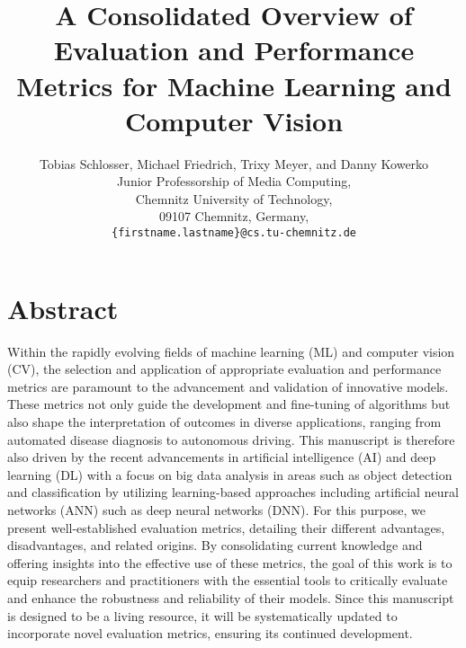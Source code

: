 \documentclass{article}
\newcommand{\ORCID}[1]{\textsuperscript{\href{https://orcid.org/#1}{\textcolor[HTML]{A6CE39}{\faOrcid}}}}
\newcommand{\ORCIDSchlosser}{0000-0002-0682-4284} %
\newcommand{\ORCIDFriedrich}{0000-0001-6326-4749} %
\newcommand{\ORCIDMeyer}{0000-0002-3372-1619}     %
\newcommand{\ORCIDKowerko}{0000-0002-4538-7814}   %
\begin{document}
\title{\Huge A Consolidated Overview of Evaluation and Performance Metrics for Machine Learning and Computer Vision}

\author{
	Tobias Schlosser\ORCID{\ORCIDSchlosser}, Michael Friedrich\ORCID{\ORCIDFriedrich}, Trixy Meyer\ORCID{\ORCIDMeyer}, and Danny Kowerko\ORCID{\ORCIDKowerko} \\[1ex]
	Junior Professorship of Media Computing, \\
	Chemnitz University of Technology, \\
	09107 Chemnitz, Germany, \\
	\texttt{\{firstname.lastname\}@cs.tu-chemnitz.de}
}




\maketitle




\section*{Abstract}

Within the rapidly evolving fields of machine learning (ML) and computer vision (CV), the selection and application of appropriate evaluation and performance metrics are paramount to the advancement and validation of innovative models. These metrics not only guide the development and fine-tuning of algorithms but also shape the interpretation of outcomes in diverse applications, ranging from automated disease diagnosis to autonomous driving. This manuscript is therefore also driven by the recent advancements in artificial intelligence (AI) and deep learning (DL) with a focus on big data analysis in areas such as object detection and classification by utilizing learning-based approaches including artificial neural networks (ANN) such as deep neural networks (DNN). For this purpose, we present well-established evaluation metrics, detailing their different advantages, disadvantages, and related origins. By consolidating current knowledge and offering insights into the effective use of these metrics, the goal of this work is to equip researchers and practitioners with the essential tools to critically evaluate and enhance the robustness and reliability of their models. Since this manuscript is designed to be a living resource, it will be systematically updated to incorporate novel evaluation metrics, ensuring its continued development.
\end{document}
